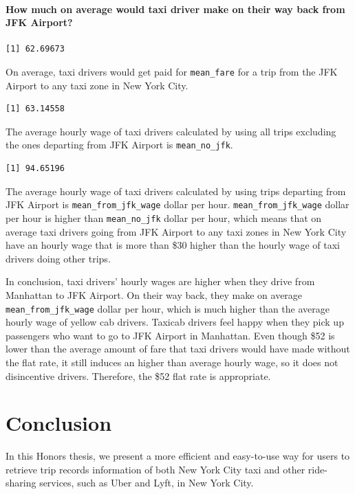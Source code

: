 \documentclass[12pt,twoside]{reedthesis}
\theoremstyle{definition}
\theoremstyle{definition}
\theoremstyle{definition}
\theoremstyle{remark}
\begin{document}
\subsubsection{How much on average would taxi driver make on their way
back from JFK
Airport?}\label{how-much-on-average-would-taxi-driver-make-on-their-way-back-from-jfk-airport-1}
\begin{verbatim}
[1] 62.69673
\end{verbatim}
On average, taxi drivers would get paid for \texttt{mean\_fare} for a
trip from the JFK Airport to any taxi zone in New York City.
\begin{verbatim}
[1] 63.14558
\end{verbatim}
The average hourly wage of taxi drivers calculated by using all trips
excluding the ones departing from JFK Airport is \texttt{mean\_no\_jfk}.
\begin{verbatim}
[1] 94.65196
\end{verbatim}
The average hourly wage of taxi drivers calculated by using trips
departing from JFK Airport is \texttt{mean\_from\_jfk\_wage} dollar per
hour. \texttt{mean\_from\_jfk\_wage} dollar per hour is higher than
\texttt{mean\_no\_jfk} dollar per hour, which means that on average taxi
drivers going from JFK Airport to any taxi zones in New York City have
an hourly wage that is more than \$30 higher than the hourly wage of
taxi drivers doing other trips.

In conclusion, taxi drivers' hourly wages are higher when they drive
from Manhattan to JFK Airport. On their way back, they make on average
\texttt{mean\_from\_jfk\_wage} dollar per hour, which is much higher
than the average hourly wage of yellow cab drivers. Taxicab drivers feel
happy when they pick up passengers who want to go to JFK Airport in
Manhattan. Even though \$52 is lower than the average amount of fare
that taxi drivers would have made without the flat rate, it still
induces an higher than average hourly wage, so it does not disincentive
drivers. Therefore, the \$52 flat rate is appropriate.

\chapter{Conclusion}\label{chapter6}

In this Honors thesis, we present a more efficient and easy-to-use way
for users to retrieve trip records information of both New York City
taxi and other ride-sharing services, such as Uber and Lyft, in New York
City.
\end{document}

